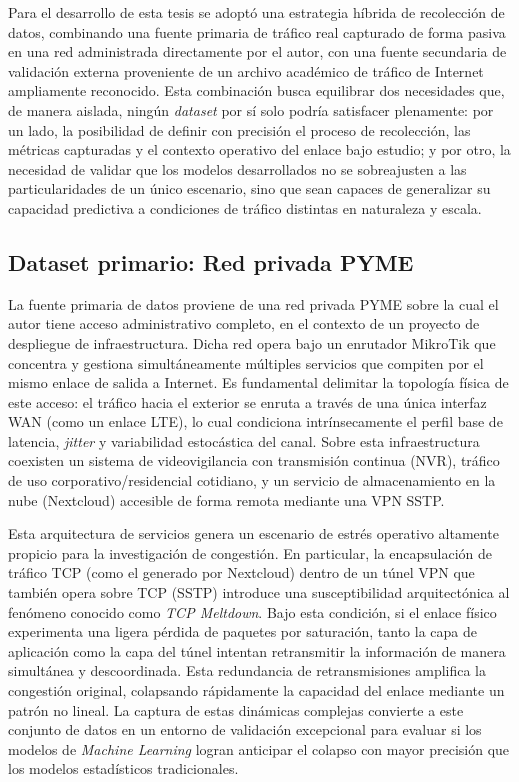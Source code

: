 \documentclass[12pt]{report}
\begin{document}
Para el desarrollo de esta tesis se adoptó una estrategia híbrida de recolección de datos, combinando una fuente primaria de tráfico real capturado de forma pasiva en una red administrada directamente por el autor, con una fuente secundaria de validación externa proveniente de un archivo académico de tráfico de Internet ampliamente reconocido. Esta combinación busca equilibrar dos necesidades que, de manera aislada, ningún \textit{dataset} por sí solo podría satisfacer plenamente: por un lado, la posibilidad de definir con precisión el proceso de recolección, 
las métricas capturadas y el contexto operativo del enlace bajo estudio; y por otro, la necesidad de validar que los modelos desarrollados no se sobreajusten a las particularidades de un único escenario, sino que sean capaces de generalizar su capacidad predictiva a condiciones de tráfico distintas en naturaleza y escala.

\subsection*{Dataset primario: Red privada PYME}

La fuente primaria de datos proviene de una red privada PYME sobre la cual el autor tiene acceso administrativo completo, en el contexto de un proyecto de despliegue de infraestructura. Dicha red opera bajo un enrutador MikroTik que concentra y gestiona simultáneamente múltiples servicios que compiten por el mismo enlace de salida a Internet. Es fundamental delimitar la topología física de este acceso: el tráfico hacia el exterior se enruta a través de una única interfaz WAN (como un enlace LTE), lo cual condiciona intrínsecamente el perfil base de latencia, 
\textit{jitter} y variabilidad estocástica del canal. Sobre esta infraestructura coexisten un sistema de videovigilancia con transmisión continua (NVR), tráfico de uso corporativo/residencial cotidiano, y un servicio de almacenamiento en la nube (Nextcloud) accesible de forma remota mediante una VPN SSTP.

Esta arquitectura de servicios genera un escenario de estrés operativo altamente propicio para la investigación de congestión. En particular, la encapsulación de tráfico TCP (como el generado por Nextcloud) dentro de un túnel VPN que también opera sobre TCP (SSTP) introduce una susceptibilidad arquitectónica al fenómeno conocido como \textit{TCP Meltdown}. Bajo esta condición, si el enlace físico experimenta una ligera pérdida de paquetes por saturación, tanto la capa de aplicación como la capa del túnel intentan retransmitir la información de manera 
simultánea y descoordinada. Esta redundancia de retransmisiones amplifica la congestión original, colapsando rápidamente la capacidad del enlace mediante un patrón no lineal. La captura de estas dinámicas complejas convierte a este conjunto de datos en un entorno de validación excepcional para evaluar si los modelos de \textit{Machine Learning} logran anticipar el colapso con mayor precisión que los modelos estadísticos tradicionales. 
\end{document}
